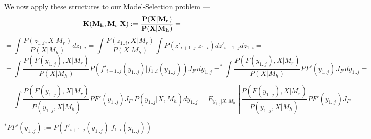 \documentclass[10pt,a4paper]{article}
\begin{document}
We now apply these structures to our Model-Selection problem ---\\

\[\bf{K(M_h, M_r|X)}:= \frac{P(X|M_r)}{P(X|M_h)}=\]
\[= \int \frac{P(z_{1..i},X|M_r)}{P(X|M_h)} dz_{1..i} = \int \frac{P(z_{1..i},X|M_r)}{P(X|M_h)} \int P(z'_{i+1..j}|z_{1..i}) dz'_{i+1..j} dz_{1..i} =   \]
\[ = \int \frac{P(F(y_{1..j}),X|M_r)}{P(X|M_h)} P(f'_{i+1..j}(y_{1..j})|f_{1..i}(y_{1..j}))    J_{F'}dy_{1..j} =^* \int \frac{P(F(y_{1..j}),X|M_r)}{P(X|M_h)} PF'(y_{1..j}) J_{F'} dy_{1..j}=\]

\[= \int \frac{P(F(y_{1..j}),X|M_r)}{P(y_{1..j}, X|M_h)} 
PF'(y_{1..j}) J_{F'} P(y_{1..j}|X, M_h) dy_{1..j} = E_{y_{1..j}|X,M_h} \left [\frac{P(F(y_{1..j}),X|M_r)}{P(y_{1..j}, X|M_h)} 
PF'(y_{1..j}) J_{F'} \right ] \]

\indent\indent\indent\indent\indent\indent\indent\indent\indent\indent\indent\indent\indent\indent\indent\indent\indent\indent \small  $^* PF'(y_{1..j}) := P(f'_{i+1..j}(y_{1..j})|f_{1..i}(y_{1..j})) $ \normalsize
\end{document}
